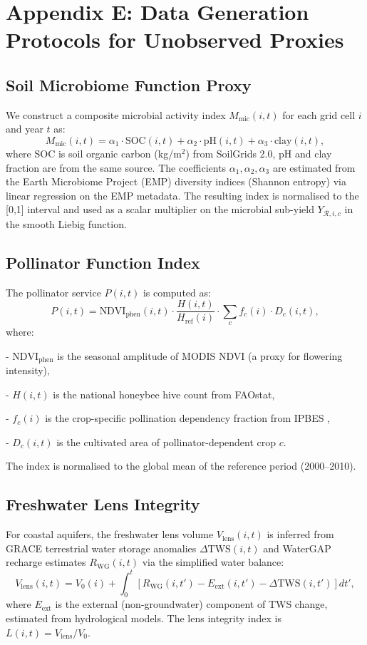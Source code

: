 \documentclass[twocolumn,10pt]{article}
\begin{document}
\section{Appendix E: Data Generation Protocols for Unobserved Proxies}
\subsection{Soil Microbiome Function Proxy}
We construct a composite microbial activity index \(M_{\text{mic}}(i,t)\) for each grid cell \(i\) and year \(t\) as:
\[
M_{\text{mic}}(i,t) = \alpha_1 \cdot \text{SOC}(i,t) + \alpha_2 \cdot \text{pH}(i,t) + \alpha_3 \cdot \text{clay}(i,t),
\]
where SOC is soil organic carbon (kg/m\(^2\)) from SoilGrids 2.0, pH and clay fraction are from the same source. The coefficients \(\alpha_1,\alpha_2,\alpha_3\) are estimated from the Earth Microbiome Project (EMP) diversity indices (Shannon entropy) via linear regression on the EMP metadata. The resulting index is normalised to the [0,1] interval and used as a scalar multiplier on the microbial sub-yield \(Y_{\mathcal{R},i,c}\) in the smooth Liebig function.

\subsection{Pollinator Function Index}
The pollinator service \(P(i,t)\) is computed as:
\[
P(i,t) = \text{NDVI}_{\text{phen}}(i,t) \cdot \frac{H(i,t)}{H_{\text{ref}}(i)} \cdot \sum_{c} f_{c}(i) \cdot D_{c}(i,t),
\]
where:

- \(\text{NDVI}_{\text{phen}}\) is the seasonal amplitude of MODIS NDVI (a proxy for flowering intensity),

- \(H(i,t)\) is the national honeybee hive count from FAOstat,

- \(f_c(i)\) is the crop-specific pollination dependency fraction from IPBES \cite{ipbes2019},

- \(D_c(i,t)\) is the cultivated area of pollinator-dependent crop \(c\).

The index is normalised to the global mean of the reference period (2000--2010).

\subsection{Freshwater Lens Integrity}
For coastal aquifers, the freshwater lens volume \(V_{\text{lens}}(i,t)\) is inferred from GRACE terrestrial water storage anomalies \(\Delta\text{TWS}(i,t)\) and WaterGAP recharge estimates \(R_{\text{WG}}(i,t)\) via the simplified water balance:
\[
V_{\text{lens}}(i,t) = V_0(i) + \int_0^t \left[ R_{\text{WG}}(i,t') - E_{\text{ext}}(i,t') - \Delta\text{TWS}(i,t') \right] dt',
\]
where \(E_{\text{ext}}\) is the external (non-groundwater) component of TWS change, estimated from hydrological models. The lens integrity index is \(L(i,t) = V_{\text{lens}}/V_0\).
\end{document}

